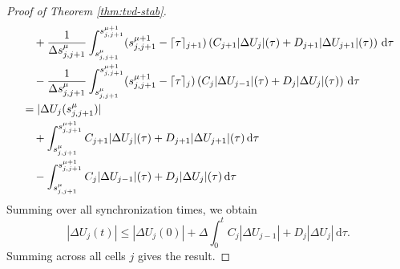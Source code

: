 \begin{proof}[Proof of Theorem \ref{thm:tvd-stab}]
\begin{align*}
& \quad + \frac{1}{\Delta s^{\mu}_{j,j+1}} \int_{s^{\mu}_{j,j+1}}^{s^{\mu+1}_{j,j+1}} ( s^{\mu+1}_{j,j+1} - \lceil \tau \rceil_{j+1} ) \left( C_{j+1} |\Delta U_j|(\tau) + D_{j+1} | \Delta U_{j+1}| (\tau) \right) \,\mathrm{d} \tau\\
& \quad - \frac{1}{\Delta s^{\mu}_{j,j+1}} \int_{s^{\mu}_{j,j+1}}^{s^{\mu+1}_{j,j+1}} ( s^{\mu+1}_{j,j+1} - \lceil \tau \rceil_{j}) \left( C_{j} |\Delta U_{j-1}|(\tau) + D_{j} | \Delta U_{j}| (\tau) \right) \,\mathrm{d} \tau\\
& = | \Delta U_j(s^{\mu}_{j,j+1})|\\
& \quad + \int_{s^{\mu}_{j,j+1}}^{s^{\mu+1}_{j,j+1}} C_{j+1} |\Delta U_j|(\tau) + D_{j+1} | \Delta U_{j+1}| (\tau) \,\mathrm{d} \tau\\
& \quad - \int_{s^{\mu}_{j,j+1}}^{s^{\mu+1}_{j,j+1}} C_{j} |\Delta U_{j-1}|(\tau) + D_{j} | \Delta U_{j}| (\tau) \,\mathrm{d} \tau\\
\end{align*}
Summing over all synchronization times, we obtain
\begin{equation*}
|\Delta U_j (t)| \le |\Delta U_j(0)| + \Delta \int_0^t C_j |\Delta U_{j-1}| + D_j |\Delta U_j|\,\mathrm{d} \tau.
\end{equation*}
Summing across all cells $j$ gives the result.
\end{proof}
